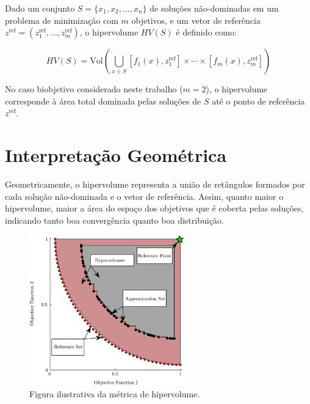 \documentclass[
	12pt,				%
	oneside,			%
	a4paper,			%
	chapter=TITLE,
	sumario=tradicional,
	english,			%
	brazil				%
]{abntex2}
\begin{document}
Dado um conjunto $S = \{x_1, x_2, \dots, x_n\}$ de soluções não-dominadas em um problema de minimização com $m$ objetivos, e um vetor de
referência $z^{\text{ref}} = (z_1^{\text{ref}}, \dots, z_m^{\text{ref}})$, o hipervolume $HV(S)$ é definido como:

\begin{equation}
HV(S) = \text{Vol} \left( \bigcup_{x \in S} [f_1(x), z_1^{\text{ref}}] \times \cdots \times [f_m(x), z_m^{\text{ref}}] \right)
\end{equation}

No caso biobjetivo considerado neste trabalho ($m = 2$), o hipervolume corresponde à área total dominada pelas soluções de $S$ até o
ponto de referência $z^{\text{ref}}$.

\section{Interpretação Geométrica}

Geometricamente, o hipervolume representa a união de retângulos formados por cada solução não-dominada e o vetor de referência.
Assim, quanto maior o hipervolume, maior a área do espaço dos objetivos que é coberta pelas soluções, indicando tanto boa convergência quanto boa distribuição.

\begin{figure}[h!]
	\caption{\label{fig:hypervolume}Figura ilustrativa da métrica de hipervolume.}
	\begin{center}
    \includegraphics[width=0.6\textwidth,clip]{Illustration-hypervolume-metric.png}
	\end{center}
\end{figure}
\end{document}
